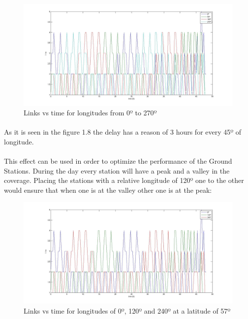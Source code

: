 \documentclass[12pt,a4paper]{report}
\begin{document}
\begin{figure}[H]
\begin{center}
\includegraphics[scale=0.30]{0_90_180_270_long.jpg}
\caption{Links vs time for longitudes from 0º to 270º}
\end{center}
\end{figure}

\paragraph{}
As it is seen in the figure 1.8 the delay has a reason of 3 hours for every 45º of longitude. 
\paragraph{}
This effect can be used in order to optimize the performance of the Ground Stations. During the day every station will have a peak and a valley in the coverage. Placing the stations with a relative longitude of 120º one to the other would ensure that when one is at the valley other one is at the peak:

\begin{figure}[H]
\begin{center}
\includegraphics[scale=0.30]{0_120_240_long.jpg}
\caption{Links vs time for longitudes of 0º, 120º and 240º at a latitude of 57º}
\end{center}
\end{figure}
\end{document}
